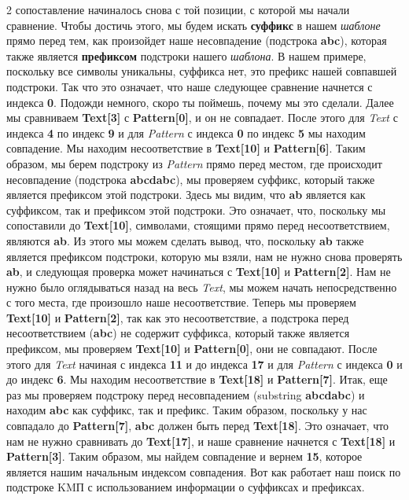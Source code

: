 2
сопоставление начиналось снова с той позиции, с которой мы начали сравнение. Чтобы достичь этого,
мы будем искать \textbf{суффикс} в нашем \textit{шаблоне} прямо перед тем, как произойдет наше несовпадение
(подстрока \textbf{abc}), которая также является \textbf{префиксом} подстроки нашего \textit{шаблона}. В нашем примере,
поскольку все символы уникальны, суффикса нет, это префикс нашей совпавшей подстроки. Так что это
означает, что наше следующее сравнение начнется с индекса \textbf{0}. Подожди немного, скоро ты поймешь,
почему мы это сделали. Далее мы сравниваем \textbf{Text[3]} с \textbf{Pattern[0]}, и он не совпадает. После этого для
\textit{Text} с индекса \textbf{4} по индекс \textbf{9} и для \textit{Pattern} с индекса \textbf{0} по индекс \textbf{5} мы находим совпадение. Мы находим
несоответствие в \textbf{Text[10]} и \textbf{Pattern[6]}. Таким образом, мы берем подстроку из \textit{Pattern} прямо перед
местом, где происходит несовпадение (подстрока \textbf{abcdabc}), мы проверяем суффикс, который также
является префиксом этой подстроки. Здесь мы видим, что \textbf{ab} является как суффиксом, так и префиксом
этой подстроки. Это означает, что, поскольку мы сопоставили до \textbf{Text[10]}, символами, стоящими прямо
перед несоответствием, являются \textbf{ab}. Из этого мы можем сделать вывод, что, поскольку \textbf{ab} также
является префиксом подстроки, которую мы взяли, нам не нужно снова проверять \textbf{ab}, и следующая
проверка может начинаться с \textbf{Text[10]} и \textbf{Pattern[2]}. Нам не нужно было оглядываться назад на весь \textit{Text},
мы можем начать непосредственно с того места, где произошло наше несоответствие. Теперь мы
проверяем \textbf{Text[10]} и \textbf{Pattern[2]}, так как это несоответствие, а подстрока перед несоответствием (\textbf{abc}) не
содержит суффикса, который также является префиксом, мы проверяем \textbf{Text[10]} и \textbf{Pattern[0]}, они не
совпадают. После этого для \textit{Text} начиная с индекса \textbf{11} и до индекса \textbf{17} и для \textit{Pattern} с индекса \textbf{0} и до
индекс \textbf{6}. Мы находим несоответствие в \textbf{Text[18]} и \textbf{Pattern[7]}. Итак, еще раз мы проверяем подстроку
перед несовпадением (substring \textbf{abcdabc}) и находим \textbf{abc} как суффикс, так и префикс. Таким образом,
поскольку у нас совпадало до \textbf{Pattern[7]}, \textbf{abc} должен быть перед \textbf{Text[18]}. Это означает, что нам не
нужно сравнивать до \textbf{Text[17]}, и наше сравнение начнется с \textbf{Text[18]} и \textbf{Pattern[3]}. Таким образом, мы
найдем совпадение и вернем \textbf{15}, которое является нашим начальным индексом совпадения. Вот как
работает наш поиск по подстроке KMП с использованием информации о суффиксах и префиксах.
\vspace{\baselineskip}


